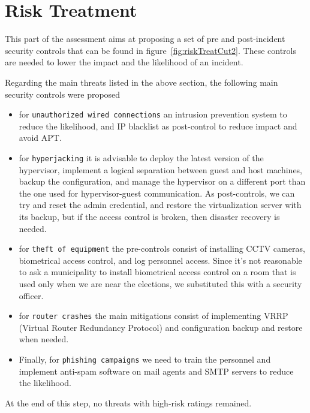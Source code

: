 \section*{Risk Treatment}

This part of the assessment aims at proposing a set of pre and post-incident security controls that can be found in figure~\ref{fig:riskTreatCut2}. These controls are needed to lower the impact and the likelihood of an incident.

Regarding the main threats listed in the above section, the following main security controls were proposed

\begin{itemize}
    \item for \texttt{unauthorized wired connections} an intrusion prevention system to reduce the likelihood, and IP blacklist as post-control to reduce impact and avoid APT.
    \item for \texttt{hyperjacking} it is advisable to deploy the latest version of the hypervisor, implement a logical separation between guest and host machines, backup the configuration, and manage the hypervisor on a different port than the one used for hypervisor-guest communication\cite{online:virtualSec}. As post-controls, we can try and reset the admin credential, and restore the virtualization server with its backup, but if the access control is broken, then disaster recovery is needed.
    \item for \texttt{theft of equipment} the pre-controls consist of installing CCTV cameras, biometrical access control, and log personnel access. Since it's not reasonable to ask a municipality to install biometrical access control on a room that is used only when we are near the elections, we substituted this with a security officer.\cite{online:roomSec}
    \item for \texttt{router crashes} the main mitigations consist of implementing VRRP (Virtual Router Redundancy Protocol) \cite{online:VRRP} and configuration backup and restore when needed.
    \item Finally, for \texttt{phishing campaigns} we need to train the personnel and implement anti-spam software on mail agents and SMTP servers to reduce the likelihood.
\end{itemize}


At the end of this step, no threats with high-risk ratings remained.\\


